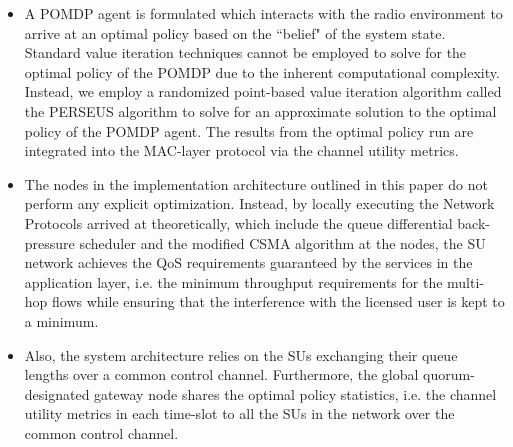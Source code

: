 \documentclass[12pt, draftcls, onecolumn]{IEEEtran}
\begin{document}
\begin{itemize}
    \item A POMDP agent is formulated which interacts with the radio environment to arrive at an optimal policy based on the ``belief" of the system state. Standard value iteration techniques cannot be employed to solve for the optimal policy of the POMDP due to the inherent computational complexity. Instead, we employ a randomized point-based value iteration algorithm called the PERSEUS algorithm to solve for an approximate solution to the optimal policy of the POMDP agent. The results from the optimal policy run are integrated into the MAC-layer protocol via the channel utility metrics.
    \item The nodes in the implementation architecture outlined in this paper do not perform any explicit optimization. Instead, by locally executing the Network Protocols arrived at theoretically, which include the queue differential back-pressure scheduler and the modified CSMA algorithm at the nodes, the SU network achieves the QoS requirements guaranteed by the services in the application layer, i.e. the minimum throughput requirements for the multi-hop flows while ensuring that the interference with the licensed user is kept to a minimum.
    \item Also, the system architecture relies on the SUs exchanging their queue lengths over a common control channel. Furthermore, the global quorum-designated gateway node shares the optimal policy statistics, i.e. the channel utility metrics in each time-slot to all the SUs in the network over the common control channel.
\end{itemize}
\clearpage
\end{document}
